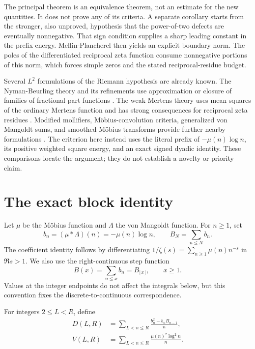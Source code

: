\documentclass[11pt,a4paper]{amsart}
\theoremstyle{definition}
\theoremstyle{remark}
\begin{document}
The principal theorem is an equivalence theorem, not an estimate for the
new quantities.  It does not prove any of its criteria.  A separate corollary
starts from the stronger, also unproved, hypothesis that the power-of-two
defects are eventually nonnegative.  That sign condition supplies a sharp
leading constant in the prefix energy.  Mellin-Plancherel then yields an
explicit boundary norm.  The poles of the differentiated reciprocal zeta
function consume nonnegative portions of this norm, which forces simple
zeros and the stated reciprocal-residue budget.

Several $L^2$ formulations of the Riemann hypothesis are already known.
The Nyman-Beurling theory and its refinements use approximation or closure of
families of fractional-part functions
\cite{Nyman1950,Beurling1955,BaezDuarte2003,Kapustin2019}.  The weak Mertens
theory uses mean squares of the ordinary Mertens function and has strong
consequences for reciprocal zeta residues \cite{Titchmarsh1986,Ng2004}.
Modified mollifiers, M\"obius-convolution criteria, generalized von Mangoldt
sums, and smoothed M\"obius transforms provide further nearby formulations
\cite{ConreyMyerson2000,BaezDuarte2005,BanksSinha2022,Verjovsky2026}.
The criterion here instead uses the literal prefix of $-\mu(n)\log n$, its
positive weighted square energy, and an exact signed dyadic identity.  These
comparisons locate the argument; they do not establish a novelty or priority
claim.

\section{The exact block identity}

Let $\mu$ be the M\"obius function and $\Lambda$ the von Mangoldt function.
For $n\geq1$, set
\begin{equation}\label{eq:bB}
 b_n=(\mu*\Lambda)(n)=-\mu(n)\log n,
 \qquad
 B_N=\sum_{n\leq N}b_n.
\end{equation}
The coefficient identity follows by differentiating
$1/\zeta(s)=\sum_{n\geq1}\mu(n)n^{-s}$ in $\Re s>1$.  We also use the
right-continuous step function
\begin{equation}\label{eq:step}
 B(x)=\sum_{n\leq x}b_n=B_{\lfloor x\rfloor},
 \qquad x\geq1.
\end{equation}
Values at the integer endpoints do not affect the integrals below, but this
convention fixes the discrete-to-continuous correspondence.

For integers $2\leq L<R$, define
\begin{align}
 D(L,R)&=\sum_{L<n\leq R}
 \frac{b_n^2-b_nB_{n-1}}{n},\label{eq:D}\\
 V(L,R)&=\sum_{L<n\leq R}
 \frac{\mu(n)^2\log^2 n}{n}.\label{eq:V}
\end{align}
\end{document}
